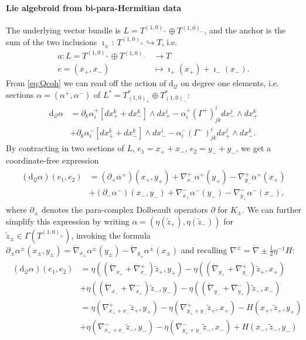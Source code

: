 \documentclass{article}
\newcommand{\QQ}{\mathcal{Q}}
\newcommand{\lc}{\mathring{\n}}
\newcommand{\ap}{\alpha}
\def\w{\wedge}
\newcommand{\p}{\partial}
\newcommand{\n}{\nabla}
\newcommand{\rd}{\mathrm{d}}
\newcommand{\se}{\Gamma}
\newcommand{\zt}{\tl{z}}
\def\tl{\tilde}
\theoremstyle{definition}
\theoremstyle{definition}
\theoremstyle{remark}
\begin{document}
\paragraph{Lie algebroid from bi-para-Hermitian data} The underlying vector bundle is $L=T^{(1,0)_+}\oplus T^{(1,0)_-}$, and the anchor is the sum of the two inclusions $\imath_\pm:\ T^{(1,0)_\pm}\hookrightarrow T$, i.e.
\begin{align*}
a:L=T^{(1,0)_+}\oplus T^{(1,0)_-} &\rightarrow T\\
 e=(x_+,x_-) &\mapsto \imath_+(x_+)+\imath_-(x_-).
\end{align*}
From \eqref{eq:Qcoh} we can read off the action of $\rd_\QQ$ on degree one elements, i.e. sections $\alpha=(\alpha^+,\alpha^-)$ of $L^*=T^*_{(1,0)_+}\oplus T^*_{(1,0)_-}$:
\begin{align*}
\rd_\QQ\alpha&=\p_k\ap_i^+[dx_+^k+dx_-^k]\w dx_+^i-\ap^+_i(\Gamma^+)^i_{jk}dx_-^j\w dx_+^k\\
&+\p_k\ap_i^-[dx_+^k+dx_-^k]\w dx_-^i-\ap^-_i(\Gamma^-)^i_{jk}dx_+^j\w dx_-^k.
\end{align*}
By contracting in two sections of $L$, $e_1=x_++x_-$, $e_2=y_-+y_-$, we get a coordinate-free expression
\begin{align}\label{eq:dQ}
\begin{aligned}
(\rd_\QQ\ap)(e_1,e_2)&=(\p_+\ap^+)(x_+,y_+)+\n^+_{x_-}\ap^+(y_+)-\n^+_{y_-}\ap^+(x_+)\\
&+(\p_-\ap^-)(x_-,y_-)+\n^-_{x_+}\ap^-(y_-)-\n^-_{y_+}\ap^-(x_-),
\end{aligned}
\end{align}
where $\p_\pm$ denotes the para-complex Dolbeault operators $\p$ for $K_\pm$. We can further simplify this expression by writing $\ap=(\eta(\tl{z}_+),\eta(\tl{z}_-))$ for $\tl{z}_\pm \in \se(T^{(1,0)_\pm})$, invoking the formula $\p_\pm\ap^\pm(x_\pm,y_\pm)=\lc_{x_\pm}\ap^\pm(y_\pm)-\lc_{y_\pm}\ap^\pm(x_\pm)$ and recalling $\n^\pm=\lc\pm \frac{1}{2}\eta^{-1}H$:
\begin{align}
\begin{aligned}
(\rd_\QQ\ap)(e_1,e_2)&=\eta((\lc_{x_+}+\n_{x_-}^+)\zt_+,y_+)-\eta((\lc_{y_+}+\n_{y_-}^+)\zt_+,x_+)\\
&+\eta((\lc_{x_-}+\n_{x_+}^-)\zt_-,y_-)-\eta((\lc_{y_-}+\n_{y_+}^-)\zt_-,x_-)\\
&=\eta(\n^+_{x_++x_-}\zt_+,y_+)-\eta(\n_{y_++y_-}^+\zt_+,x_+)-H(x_+,\zt_+,y_+)\\
&+\eta(\n_{x_++x_-}^-\zt_-,y_-)-\eta(\n_{y_++y_-}^-\zt_-,x_-)+H(x_-,\zt_-,y_-)
\end{aligned}
\end{align}
\end{document}
